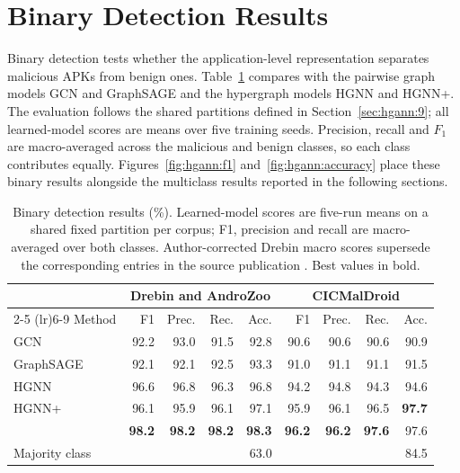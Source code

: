 \section{Binary Detection Results}
\label{sec:hgann:10}

Binary detection tests whether the application-level representation separates malicious APKs
from benign ones. Table~\ref{tab:hgann:binary} compares \hgann{} with the pairwise graph models
GCN and GraphSAGE and the hypergraph models HGNN and HGNN+. The evaluation follows the shared
partitions defined in Section~\ref{sec:hgann:9}; all learned-model scores are means over
five training seeds. Precision, recall and $F_1$ are macro-averaged across the malicious and
benign classes, so each class contributes equally. Figures~\ref{fig:hgann:f1}
and~\ref{fig:hgann:accuracy} place these binary results alongside the multiclass results reported
in the following sections.

\begin{table}
  \caption{Binary detection results (\%). Learned-model scores are five-run means on a shared
  fixed partition per corpus; F1, precision and recall are macro-averaged over both classes.
  Author-corrected Drebin macro scores supersede the corresponding entries in the source
  publication \cite{norouzian2025hgannmal}. Best values in bold.}
  \label{tab:hgann:binary}
  \centering
  \begin{tabular}{lrrrr@{\hskip 2em}rrrr}
    \toprule
    & \multicolumn{4}{c}{Drebin and AndroZoo} & \multicolumn{4}{c}{CICMalDroid} \\
    \cmidrule(lr){2-5} \cmidrule(lr){6-9}
    Method & F1 & Prec. & Rec. & Acc. & F1 & Prec. & Rec. & Acc. \\
    \midrule
    GCN            & 92.2 & 93.0 & 91.5 & 92.8 & 90.6 & 90.6 & 90.6 & 90.9 \\
    GraphSAGE      & 92.1 & 92.1 & 92.5 & 93.3 & 91.0 & 91.1 & 91.1 & 91.5 \\
    \midrule
    HGNN           & 96.6 & 96.8 & 96.3 & 96.8 & 94.2 & 94.8 & 94.3 & 94.6 \\
    HGNN+          & 96.1 & 95.9 & 96.1 & 97.1 & 95.9 & 96.1 & 96.5 & \textbf{97.7} \\
    \hgann{}       & \textbf{98.2} & \textbf{98.2} & \textbf{98.2} & \textbf{98.3}
                   & \textbf{96.2} & \textbf{96.2} & \textbf{97.6} & 97.6 \\
    \midrule
    Majority class & & & & 63.0 & & & & 84.5 \\
    \bottomrule
  \end{tabular}
\end{table}

